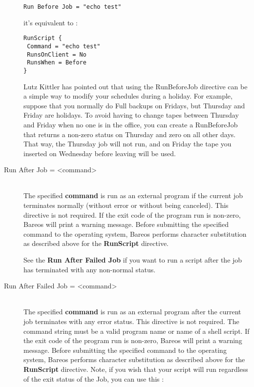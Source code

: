 \begin{description}
\begin{verbatim}
Run Before Job = "echo test"
\end{verbatim}
   it's equivalent to :
\begin{verbatim}
RunScript {
 Command = "echo test"
 RunsOnClient = No
 RunsWhen = Before
}
\end{verbatim}

Lutz Kittler has pointed out that using the RunBeforeJob directive can be a
simple way to modify your schedules during a holiday.  For example, suppose
that you normally do Full backups on Fridays, but Thursday and Friday are
holidays.  To avoid having to change tapes between Thursday and Friday when
no one is in the office, you can create a RunBeforeJob that returns a
non-zero status on Thursday and zero on all other days.  That way, the
Thursday job will not run, and on Friday the tape you inserted on Wednesday
before leaving will be used.

\item [Run After Job = {\textless}command{\textgreater}] \hfill \\
The specified {\bf command} is run as an external program if the current
job terminates normally (without error or without being canceled).  This
directive is not required.  If the exit code of the program run is
non-zero, Bareos will print a warning message.  Before submitting the
specified command to the operating system, Bareos performs character
substitution as described above for the {\bf RunScript} directive.


See the {\bf Run After Failed Job} if you
want to run a script after the job has terminated with any
non-normal status.

\item [Run After Failed Job = {\textless}command{\textgreater}] \hfill \\
The specified {\bf command} is run as an external program after the current
job terminates with any error status.  This directive is not required.  The
command string must be a valid program name or name of a shell script. If
the exit code of the program run is non-zero, Bareos will print a
warning message. Before submitting the specified command to the
operating system, Bareos performs character substitution as described above
for the {\bf RunScript} directive. Note, if you wish that your script
will run regardless of the exit status of the Job, you can use this :


\end{description}
